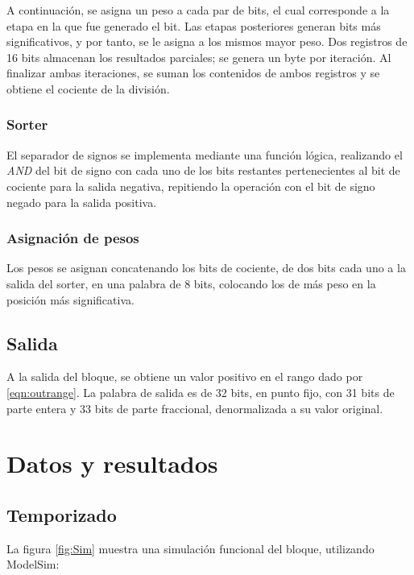 \documentclass[12pt,a4paper]{article} %
\begin{document}
A continuación, se asigna un peso a cada par de bits, el cual corresponde a la etapa en la que fue generado el bit. Las etapas posteriores generan bits más significativos, y por tanto, se le asigna a los mismos mayor peso. Dos registros de 16 bits almacenan los resultados parciales; se genera un byte por iteración. Al finalizar ambas iteraciones, se suman los contenidos de ambos registros y se obtiene el cociente de la división.

\subsubsection{Sorter}

El separador de signos se implementa mediante una función lógica, realizando el \emph{AND} del bit de signo con cada uno de los bits restantes pertenecientes al bit de cociente para la salida negativa, repitiendo la operación con el bit de signo negado para la salida positiva.

\subsubsection{Asignación de pesos}

Los pesos se asignan concatenando los bits de cociente, de dos bits cada uno a la salida del sorter, en una palabra de 8 bits, colocando los de más peso en la posición más significativa. 

\subsection{Salida}

A la salida del bloque, se obtiene un valor positivo en el rango dado por \ref{eqn:outrange}. La palabra de salida es de 32 bits, en punto fijo, con 31 bits de parte entera y 33 bits de parte fraccional, denormalizada a su valor original.

\section{Datos y resultados}

\subsection{Temporizado}

La figura \ref{fig:Sim} muestra una simulación funcional del bloque, utilizando ModelSim:
\end{document}
